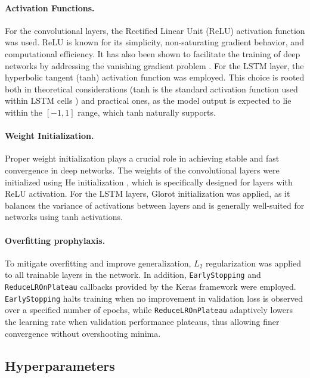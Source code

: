 \paragraph{Activation Functions.}
For the convolutional layers, the Rectified Linear Unit (ReLU) activation function was used. ReLU is known for its simplicity, non-saturating gradient behavior, and computational efficiency. It has also been shown to facilitate the training of deep networks by addressing the vanishing gradient problem \autocite{DBLP:journals/corr/abs-1803-08375}. For the LSTM layer, the hyperbolic tangent (tanh) activation function was employed. This choice is rooted both in theoretical considerations (tanh is the standard activation function used within LSTM cells \autocite{K20222637}) and practical ones, as the model output is expected to lie within the \([-1, 1]\) range, which tanh naturally supports.

\paragraph{Weight Initialization.}
Proper weight initialization plays a crucial role in achieving stable and fast convergence in deep networks. The weights of the convolutional layers were initialized using He initialization \autocite{he2015delving}, which is specifically designed for layers with ReLU activation. For the LSTM layers, Glorot initialization \autocite{glorot2010understanding} was applied, as it balances the variance of activations between layers and is generally well-suited for networks using tanh activations.

\paragraph{Overfitting prophylaxis.}
To mitigate overfitting and improve generalization, $L_2$ \autocite{kukačka2017regularizationdeeplearningtaxonomy} regularization was applied to all trainable layers in the network. In addition, \texttt{EarlyStopping} and \\ \texttt{ReduceLROnPlateau} callbacks provided by the Keras framework were employed. \texttt{EarlyStopping} halts training when no improvement in validation loss is observed over a specified number of epochs, while \texttt{ReduceLROnPlateau} adaptively lowers the learning rate when validation performance plateaus, thus allowing finer convergence without overshooting minima.

\subsection{Hyperparameters}
\label{sec:hyperparameters}


